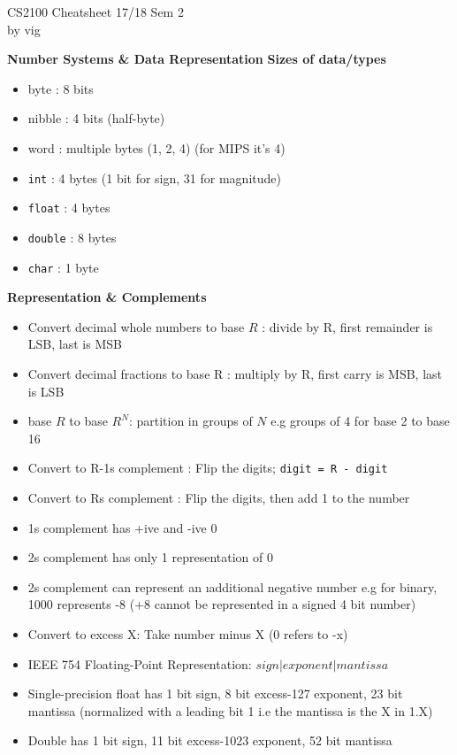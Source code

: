 \documentclass[a4paper]{article} \usepackage[backend=biber, style=numeric, sorting=none]{biblatex}
\begin{document}
\setlength\parindent{0pt} %
\scriptsize
{}

\begin{center}
{\large CS2100 Cheatsheet 17/18 Sem 2}\\{by vig}
\end{center}
    \begin{multicols*}{4}

{\small\textbf{Number Systems \& Data Representation }}
\textbf{Sizes of data/types}
\begin{itemize}[leftmargin=*]
\itemsep -0.5em
\item byte : 8 bits 
\item nibble : 4 bits (half-byte)
\item word : multiple bytes (1, 2, 4) (for MIPS it's 4)
\item \texttt{int} : 4 bytes (1 bit for sign, 31 for magnitude)
\item \texttt{float} : 4 bytes
\item \texttt{double} : 8 bytes
\item \texttt{char} : 1 byte
\end{itemize}

\textbf{Representation \& Complements}
\begin{itemize}[leftmargin=*]
\itemsep -0.5em
\item Convert decimal whole numbers to base $R$ : divide by R, first remainder is LSB, last is MSB
\item Convert decimal fractions to base R : multiply by R, first carry is MSB, last is LSB
\item base ${R}$ to base ${R^N}$: partition in groups of $N$ e.g groups of 4 for base 2 to base 16
\item Convert to R-1s complement : Flip the digits; \texttt{digit = R - digit}
\item Convert to Rs complement : Flip the digits, then add 1 to the number
\item 1s complement has +ive and -ive 0
\item 2s complement has only 1 representation of 0
\item 2s complement can represent an \i{additional} negative number e.g for binary, 1000 represents -8 (+8 cannot be represented in a signed 4 bit number)
\item Convert to excess X: Take number minus X (0 refers to -x)
\item IEEE 754 Floating-Point Representation:  $sign  | exponent  |  mantissa$
\item Single-precision float has 1 bit sign, 8 bit excess-127 exponent, 23 bit mantissa (normalized with a leading bit 1 i.e the mantissa is the X in 1.X)
\item Double has 1 bit sign, 11 bit excess-1023 exponent, 52 bit mantissa 
\end{itemize}


\end{multicols*}
\end{document}
